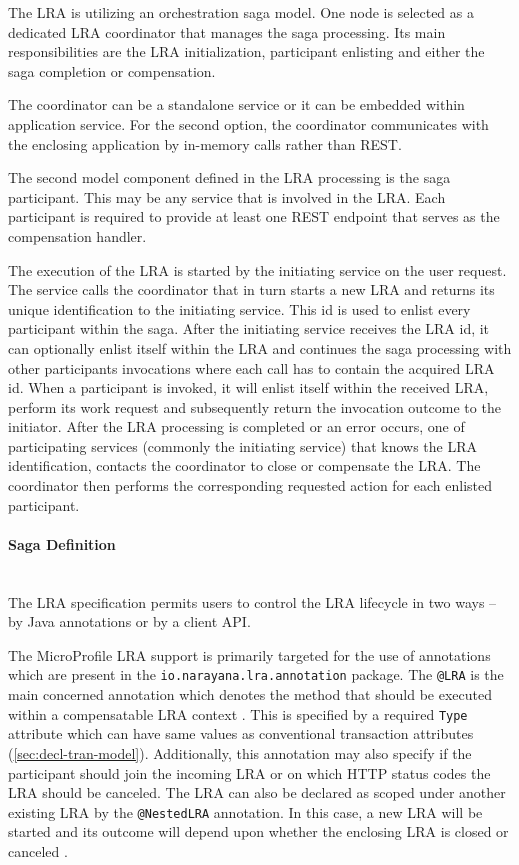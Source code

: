 \documentclass[oneside,
  digital, %
  table,   %
  lof,     %
  lot,     %
]{fithesis3}
\newcommand{\newlinepar}[1]{\paragraph{#1}\needspace{4\baselineskip}\mbox{}\\}
\begin{document}
The LRA is utilizing an orchestration saga model. One node is selected as a dedicated LRA coordinator that manages the saga processing. Its main responsibilities are the LRA initialization, participant enlisting and either the saga completion or compensation. 

The coordinator can be a standalone service or it can be embedded within application service. For the second option, the coordinator communicates with the enclosing application by in-memory calls rather than REST.

The second model component defined in the LRA processing is the saga participant. This may be any service that is involved in the LRA. Each participant is required to provide at least one REST endpoint that serves as the compensation handler.

The execution of the LRA is started by the initiating service on the user request. The service calls the coordinator that in turn starts a new LRA and returns its unique identification to the initiating service. This id is used to enlist every participant within the saga. After the initiating service receives the LRA id, it can optionally enlist itself within the LRA and continues the saga processing with other participants invocations where each call has to contain the acquired LRA id. When a participant is invoked, it will enlist itself within the received LRA, perform its work request and subsequently return the invocation outcome to the initiator. 
After the LRA processing is completed or an error occurs, one of participating services (commonly the initiating service) that knows the LRA identification, contacts the coordinator to close or compensate the LRA. The coordinator then performs the corresponding requested action for each enlisted participant.
 
\newlinepar{Saga Definition}

The LRA specification permits users to control the LRA lifecycle in two ways -- by Java annotations or by a client API. 

The MicroProfile LRA support is primarily targeted for the use of annotations which are present in the \texttt{io.narayana.lra.annotation} package. The \texttt{@LRA} is the main concerned annotation which denotes the method that should be executed within a compensatable LRA context \cite{narayana_lra}. This is specified by a required \texttt{Type} attribute which can have same values as conventional transaction attributes (\ref{sec:decl-tran-model}). Additionally, this annotation may also specify if the participant should join the incoming LRA or on which HTTP status codes the LRA should be canceled. The LRA can also be declared as scoped under another existing LRA by the \texttt{@NestedLRA} annotation. In this case, a new LRA will be started and its outcome will depend upon whether the enclosing LRA is closed or canceled \cite{narayana_lra}.
\end{document}
